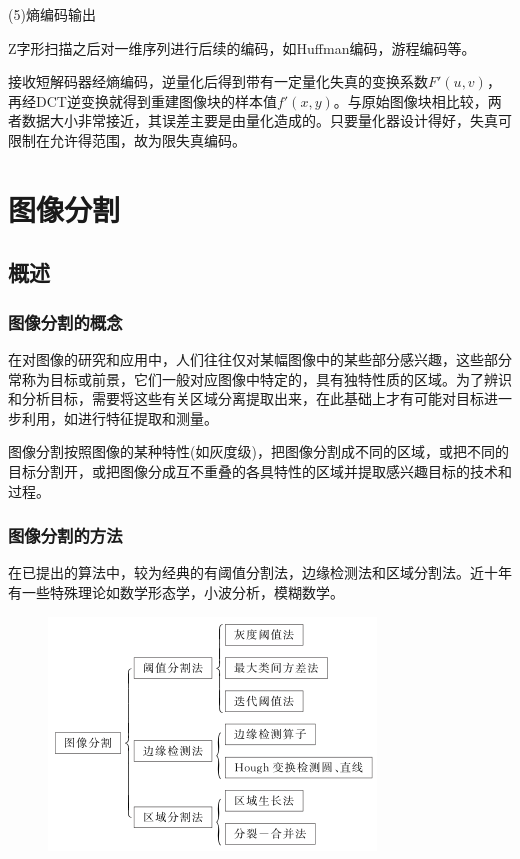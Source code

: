 \documentclass[11pt]{article}
\begin{document}
(5)熵编码输出

Z字形扫描之后对一维序列进行后续的编码，如Huffman编码，游程编码等。

接收短解码器经熵编码，逆量化后得到带有一定量化失真的变换系数$F'(u,v)$，再经DCT逆变换就得到重建图像块的样本值$f'(x,y)$。与原始图像块相比较，两者数据大小非常接近，其误差主要是由量化造成的。只要量化器设计得好，失真可限制在允许得范围，故为限失真编码。

\section{图像分割}
\subsection{概述}
\subsubsection{图像分割的概念}
在对图像的研究和应用中，人们往往仅对某幅图像中的某些部分感兴趣，这些部分常称为目标或前景，它们一般对应图像中特定的，具有独特性质的区域。为了辨识和分析目标，需要将这些有关区域分离提取出来，在此基础上才有可能对目标进一步利用，如进行特征提取和测量。

图像分割按照图像的某种特性(如灰度级)，把图像分割成不同的区域，或把不同的目标分割开，或把图像分成互不重叠的各具特性的区域并提取感兴趣目标的技术和过程。

\subsubsection{图像分割的方法}
在已提出的算法中，较为经典的有阈值分割法，边缘检测法和区域分割法。近十年有一些特殊理论如数学形态学，小波分析，模糊数学。

\begin{figure}[H]
	\centering
	\includegraphics[scale=0.6]{49}
\end{figure}
\end{document}
